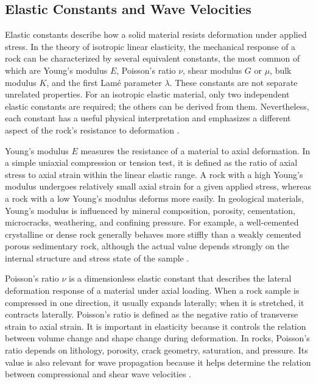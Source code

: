 \subsection{Elastic Constants and Wave Velocities}

Elastic constants describe how a solid material resists deformation under applied stress. In the theory of isotropic linear elasticity, the mechanical response of a rock can be characterized by several equivalent constants, the most common of which are Young's modulus \(E\), Poisson's ratio \(\nu\), shear modulus \(G\) or \(\mu\), bulk modulus \(K\), and the first Lam\'e parameter \(\lambda\). These constants are not separate unrelated properties. For an isotropic elastic material, only two independent elastic constants are required; the others can be derived from them. Nevertheless, each constant has a useful physical interpretation and emphasizes a different aspect of the rock's resistance to deformation \cite{jaeger2007,mavko2009}.

\enlargethispage{\baselineskip}
Young's modulus \(E\) measures the resistance of a material to axial deformation. In a simple uniaxial compression or tension test, it is defined as the ratio of axial stress to axial strain within the linear elastic range. A rock with a high Young's modulus undergoes relatively small axial strain for a given applied stress, whereas a rock with a low Young's modulus deforms more easily. In geological materials, Young's modulus is influenced by mineral composition, porosity, cementation, microcracks, weathering, and confining pressure. For example, a well-cemented crystalline or dense rock generally behaves more stiffly than a weakly cemented porous sedimentary rock, although the actual value depends strongly on the internal structure and stress state of the sample \cite{jaeger2007,mavko2009}.

Poisson's ratio \(\nu\) is a dimensionless elastic constant that describes the lateral deformation response of a material under axial loading. When a rock sample is compressed in one direction, it usually expands laterally; when it is stretched, it contracts laterally. Poisson's ratio is defined as the negative ratio of transverse strain to axial strain. It is important in elasticity because it controls the relation between volume change and shape change during deformation. In rocks, Poisson's ratio depends on lithology, porosity, crack geometry, saturation, and pressure. Its value is also relevant for wave propagation because it helps determine the relation between compressional and shear wave velocities \cite{jaeger2007,aki2002}.

